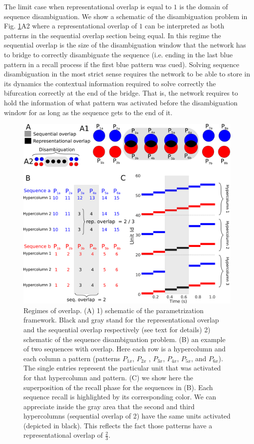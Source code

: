 \documentclass[10pt,a4paper]{article}
\begin{document}
The limit case when representational overlap is equal to $1$ is the domain of sequence disambiguation. We show a schematic of the disambiguation problem in Fig. \ref{fig:rep_diagram}A2 where a representational overlap of $1$ can be interpreted as both patterns in the sequential overlap section being equal. In this regime the sequential overlap is the size of the disambiguation window that the network has to bridge to correctly disambiguate the sequence (i.e. ending in the last blue pattern in a recall process if the first blue pattern was cued). Solving sequence disambiguation in the most strict sense requires the network to be able to store in its dynamics the contextual information required to solve correctly the bifurcation correctly at the end of the bridge. That is, the network requires to hold the information of what pattern was activated before the disambiguation window for as long as the sequence gets to the end of it.


 
\begin{figure}[H]
\centering
\includegraphics[scale=0.20]{rep_diagram.pdf}
\caption{Regimes of overlap. (A) 1) schematic of the parametrization framework. Black and gray stand for the representational overlap and the sequential overlap respectively (see text for details) 2) schematic of the sequence disambiguation problem. (B) an example of two sequences with overlap. Here each row is a hypercolumn and each column a pattern (patterns $P_{1x}$, $P_{2x}$ , $P_{3x}$, $P_{4x}$, $P_{5x}$, and $P_{6x}$). The single entries represent the particular unit that was activated for that hypercolumn and pattern. (C) we show here the superposition of the recall phase for the sequences in (B). Each sequence recall is highlighted by its corresponding color. We can appreciate inside the gray area that the second and third hypercolumns (sequential overlap of 2) have the same units activated (depicted in black). This reflects the fact those patterns have a representational overlap of $\frac{2}{3}$.}
\label{fig:rep_diagram}
\end{figure}
\end{document}
